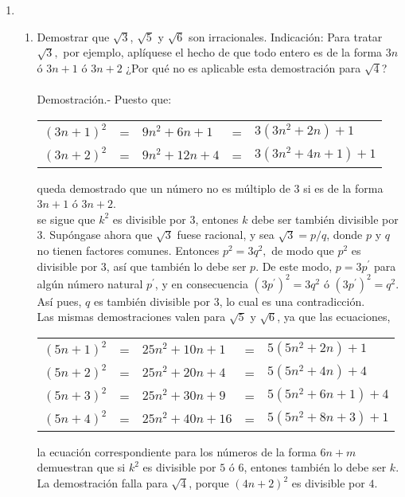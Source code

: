 \begin{enumerate}
      \item 
      \begin{enumerate}[\bfseries a)]
      \item Demostrar que $\sqrt{3}$, $\sqrt{5}$ y $\sqrt{6}$ son irracionales. Indicación: Para tratar $\sqrt{3},$ por ejemplo, aplíquese el hecho de que todo entero es de la forma $3n$ ó $3n+1$ ó $3n+2$ ¿Por qué no es aplicable esta demostración para $\sqrt{4}$?\\\\
      Demostración.- \; Puesto que:
      \begin{center}
      \begin{tabular}{r c l c l}
      $(3n+1)^2$&=&$9n^2 + 6n + 1$&=&$3(3n^2+2n) + 1$\\
      $(3n+2)^2$&=&$9n^2+12n + 4$&=&$3(3n^2 + 4n + 1) + 1$\\
      \end{tabular}
      \end{center}
      queda demostrado que un número no es múltiplo de $3$ si es de la forma $3n+1$ ó $3n+2$.\\
      se sigue que $k^2$ es divisible por $3$, entones $k$ debe ser también divisible por $3$. Supóngase ahora que $\sqrt{3}$ fuese racional, y sea $\sqrt{3} = p/q$, donde $p$ \; y \; $q$ no tienen factores comunes. Entonces $p^2=3q^2,$ de modo que $p^2$ es divisible por $3$, así que también lo debe ser $p$. De este modo, $p=3p^{'}$ para algún número natural $p^{'}$, y en consecuencia $(3p^{'})^2 = 3q^2$ ó $(3p^{'})^2 = q^2.$ Así pues, $q$ es también divisible por $3$, lo cual es una contradicción.\\
      Las mismas demostraciones valen para $\sqrt{5}$ y $\sqrt{6}$, ya que las ecuaciones,
      \begin{center}
      \begin{tabular}{rclcl}
      $(5n+1)^2$&=&$25n^2 + 10n + 1$&=&$5(5n^2 + 2n)+1$\\
      $(5n+2)^2$&=&$25n^2 + 20n + 4$&=&$5(5n^2 + 4n)+4$\\
      $(5n+3)^2$&=&$25n^2 + 30n + 9$&=&$5(5n^2 + 6n + 1)+4$\\
      $(5n+4)^2$&=&$25n^2 + 40n + 16$&=&$5(5n^2+8n+3)+1$\\
      \end{tabular}
      \end{center}
      la ecuación correspondiente para los números de la forma $6n+m$ demuestran que si $k^2$ es divisible por $5$ ó $6$, entones también lo debe ser $k$. La demostración falla para $\sqrt{4}$, porque $(4n+2)^2$ es divisible por $4$.\\\\


\end{enumerate}
\end{enumerate}

